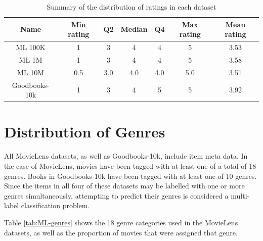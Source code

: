 \begin{table}[H]
\centering
\begin{tabular}{c | c | c | c | c | c | c}
\toprule
\textbf{Name} & \textbf{Min rating} & \textbf{Q2} & \textbf{Median} & \textbf{Q4} & \textbf{Max rating} & \textbf{Mean rating} \\
\midrule
ML 100K & 1 & 3 & 4 & 4 & 5 & 3.53 \\
ML 1M & 1 & 3 & 4 & 4 & 5 & 3.58 \\
ML 10M & 0.5 & 3.0 & 4.0 & 4.0 & 5.0 & 3.51 \\
Goodbooks-10k & 1 & 3 & 4 & 5 & 5 & 3.92 \\
\bottomrule
\end{tabular}
\caption[5-number of summaries of ratings]{Summary of the distribution of ratings in each dataset}
\label{tab:ratings-5-number-summaries}
\end{table}

\section{Distribution of Genres}
All MovieLens datasets, as well as Goodbooks-10k, include item meta data. In the case of MovieLens, movies have been tagged with at least one of a total of 18 genres. Books in Goodbooks-10k have been tagged with at least one of 10 genres. Since the items in all four of these datasets may be labelled with one or more genres simultaneously, attempting to predict their genres is considered a multi-label classification problem.

Table \ref{tab:ML-genres} shows the 18 genre categories used in the MovieLens datasets, as well as the proportion of movies that were assigned that genre.


